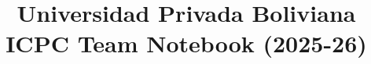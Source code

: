 \documentclass[10pt]{article}
\title{\vspace{-4ex}\Large{Universidad Privada Boliviana ICPC Team Notebook (2025-26)}}
\author{}
\date{}
\begin{document}
\begin{landscape}
\begin{multicols}{2}

\maketitle
\vspace{-13ex}
\hypertarget{TOC}{}
\begingroup\small\tableofcontents\endgroup
\begingroup\small\renewcommand{\lstlistlistingname}{List of Algorithms}\lstlistoflistings\endgroup
\newpage\newpage
\pagestyle{fancy}



\end{multicols}
\end{landscape}
\end{document}
